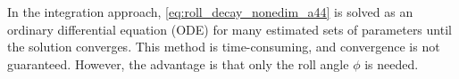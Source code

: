 In the integration approach, \autoref{eq:roll_decay_nonedim_a44} is solved as an ordinary differential equation (ODE) for many estimated sets of parameters until the solution converges. This method is time-consuming, and convergence is not guaranteed. However, the advantage is that only the roll angle $\phi$ is needed.